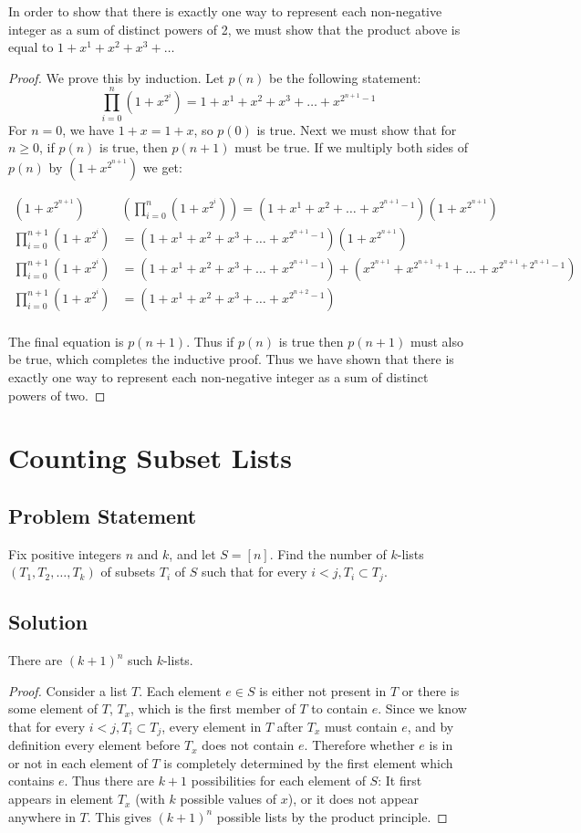 \documentclass[12pt]{article}
\newcommand{\ProblemStatement}[1]{
\subsection*{Problem Statement}
#1
\subsection*{Solution}
}
\begin{document}
In order to show that there is exactly one way to represent each non-negative integer as a sum of distinct powers of 2, we must show that the product above is equal to $1 + x^1 + x^2 + x^3 +\ldots$

\begin{proof}
    We prove this by induction. Let $p(n)$ be the following statement:
\[
    \prod_{i=0}^{n}(1+x^{2^i}) = 1 + x^1 + x^2 + x^3 +\ldots + x^{2^{n+1}-1}
\]
For $n=0$, we have $1+x = 1+x$, so $p(0)$ is true.
Next we must show that for $n \ge 0$, if $p(n)$ is true, then $p(n+1)$ must be true. If we multiply both sides of $p(n)$ by $(1 + x^{2^{n+1}})$ we get:

\begin{align*}
    \left(1 + x^{2^{n+1}}\right)&\left(\prod_{i=0}^{n}(1+x^{2^i})\right) = \left(1 + x^1 + x^2 +\ldots + x^{2^{n+1}-1}\right)\left(1 + x^{2^{n+1}}\right)\\
    \prod_{i=0}^{n+1}(1+x^{2^i}) &= \left(1 + x^1 + x^2 + x^3 +\ldots + x^{2^{n+1}-1}\right)\left(1 + x^{2^{n+1}}\right)\\
\prod_{i=0}^{n+1}(1+x^{2^i}) &= \left(1 + x^1 + x^2 + x^3 + \ldots + x^{2^{n+1}-1}\right)+\left(x^{2^{n+1}} + x^{2^{n+1}+1} + \ldots + x^{2^{n+1}+2^{n+1}-1}\right)\\
\prod_{i=0}^{n+1}(1+x^{2^i}) &= \left(1 + x^1 + x^2 + x^3 + \ldots + x^{2^{n+2}-1}\right)\\
\end{align*}

The final equation is $p(n+1)$. Thus if $p(n)$ is true then $p(n+1)$ must also be true, which completes the inductive proof. Thus we have shown that there is exactly one way to represent each non-negative integer as a sum of distinct powers of two.

\end{proof}


\section{Counting Subset Lists}
\ProblemStatement{
Fix positive integers $n$ and $k$, and let $S = [n]$. Find the number of $k$-lists $(T_1, T_2, \ldots, T_k)$ of subsets $T_i$ of $S$ such that for every $i < j, T_i \subset T_j$.
}

There are $(k+1)^n$ such $k$-lists.

\begin{proof}
Consider a list $T$. Each element $e \in S$ is either not present in $T$ or there is some element of $T$, $T_x$, which is the first member of $T$ to contain $e$. Since we know that for every $i < j, T_i \subset T_j$, every element in $T$ after $T_x$ must contain $e$, and by definition every element before $T_x$ does not contain $e$. Therefore whether $e$ is in or not in each element of $T$ is completely determined by the first element which contains $e$. Thus there are $k+1$ possibilities for each element of $S$: It first appears in element $T_x$ (with $k$ possible values of $x$), or it does not appear anywhere in $T$. This gives $(k+1)^n$ possible lists by the product principle.
\end{proof}
\end{document}
